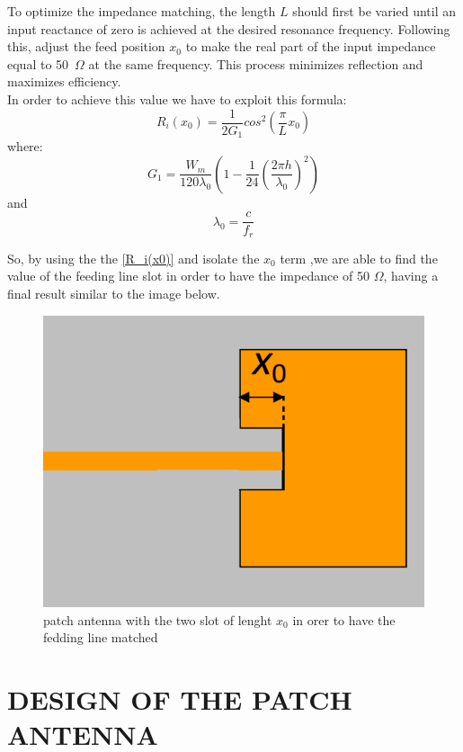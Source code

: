 \documentclass[]{article}
\begin{document}
To optimize the impedance matching, the length $L$ should first be varied until an input reactance of zero is achieved at the desired resonance frequency. Following this, adjust the feed position $x_0$ to make the real part of the input impedance equal to 50~$\Omega$ at the same frequency. This process minimizes reflection and maximizes efficiency.\\
In order to achieve this value we have to exploit this formula: 
\begin{equation}
	R_i(x_0)=\frac{1}{2G_1}cos^2(\frac{\pi}{L}x_0)
	\label{R_i(x0)}
\end{equation}
	where: 
	\begin{equation}
		G_1=\frac{W_m}{120 \lambda_0}(1-\frac{1}{24}(\frac{2 \pi h}{\lambda_0})^2)
		\label{G_1}
	\end{equation}
	and 
	\begin{equation}
		\lambda_0=\frac{c}{f_r}
	\end{equation}
	
	So, by using the the \eqref{R_i(x0)} and isolate the $x_0$ term ,we are able to find the value of the feeding line slot in order to have the impedance of 50 $\Omega$, having a final result similar to the image below. 
	\begin{figure}[h]
		\centering
		\includegraphics[width=0.4\linewidth]{img/img3}
		\caption{patch antenna with the two slot of lenght $x_0$ in orer to have the fedding line matched}
		\label{fig:img3}
	\end{figure}
	\newpage
	\section{DESIGN OF THE PATCH ANTENNA}
\end{document}
